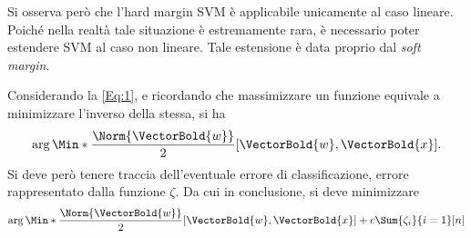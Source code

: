 \documentclass{subfiles}
\begin{document}
Si osserva però che l'hard margin SVM è applicabile unicamente al caso lineare.
Poiché nella realtà tale situazione è estremamente rara, è necessario poter estendere SVM al caso non lineare.
Tale estensione è data proprio dal \emph{soft margin}.

Considerando la \eqref{Eq:1}, e ricordando che massimizzare un funzione equivale a minimizzare l'inverso della stessa, si ha
$$
    \arg\Min*{\frac{\Norm{\VectorBold{w}}}{2}}[\VectorBold{w}, \VectorBold{x}].
$$
Si deve però tenere traccia dell'eventuale errore di classificazione, errore rappresentato dalla funzione $\zeta$.
Da cui in conclusione, si deve minimizzare
$$
    \arg\Min*{\frac{\Norm{\VectorBold{w}}}{2}}[\VectorBold{w}, \VectorBold{x}] + c \Sum{\zeta_{i}}{i = 1}[n]
$$
\end{document}
